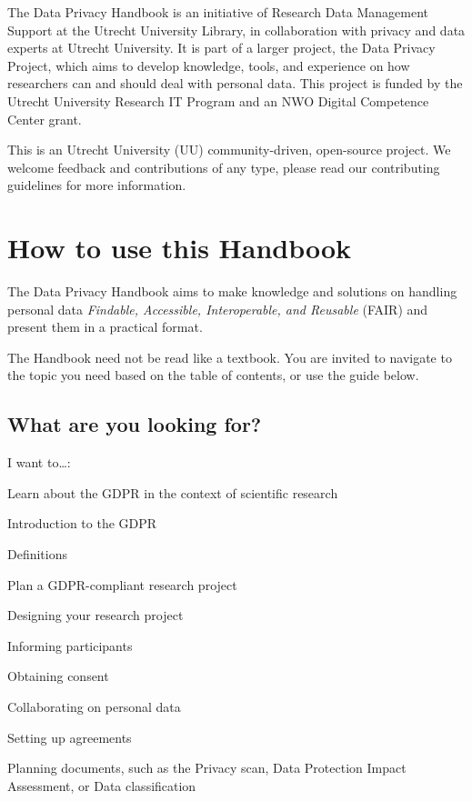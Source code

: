 \documentclass[
]{book}
\begin{document}
The Data Privacy Handbook is an initiative of
Research
Data Management Support at the Utrecht University Library, in collaboration with privacy and data experts at
Utrecht University. It is part of a larger project,
the
Data Privacy Project, which aims to develop knowledge, tools, and experience
on how researchers can and should deal with personal data. This project is
funded by the Utrecht University Research IT Program and an NWO Digital
Competence Center grant.

This is an Utrecht University (UU) community-driven,
open-source project.
We welcome feedback and contributions of any type, please read our contributing guidelines for more information.

\hypertarget{how-to-use-this-handbook}{%
\section{How to use this Handbook}\label{how-to-use-this-handbook}}

The Data Privacy Handbook aims to make knowledge and solutions on handling personal
data \emph{Findable, Accessible, Interoperable, and Reusable} (FAIR) and present them in
a practical format.

The Handbook need not be read like a textbook. You are invited to navigate to the
topic you need based on the table of contents, or use the guide below.

\hypertarget{what-are-you-looking-for}{%
\subsection{What are you looking for?}\label{what-are-you-looking-for}}

I want to\ldots:

Learn about the GDPR in the context of scientific research

Introduction to the GDPR

Definitions

Plan a GDPR-compliant research project

Designing your research project

Informing participants

Obtaining consent

Collaborating on personal data

Setting up agreements

Planning documents, such as the
Privacy scan,
Data Protection Impact Assessment, or
Data classification
\end{document}
